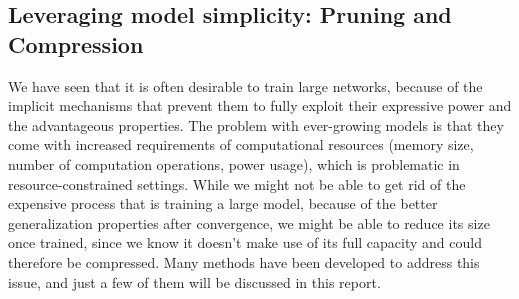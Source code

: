 

\subsection{Leveraging model simplicity: Pruning and Compression}

We have seen that it is often desirable to train large networks, because of the implicit mechanisms that prevent them to fully exploit their expressive power and the advantageous properties. The problem with ever-growing models is that they come with increased requirements of computational resources (memory size, number of computation operations, power usage), which is problematic in resource-constrained settings. While we might not be able to get rid of the expensive process that is training a large model, because of the better generalization properties after convergence, we might be able to reduce its size once trained, since we know it doesn't make use of its full capacity and could therefore be compressed. Many methods have been developed to address this issue, and just a few of them will be discussed in this report. \\

